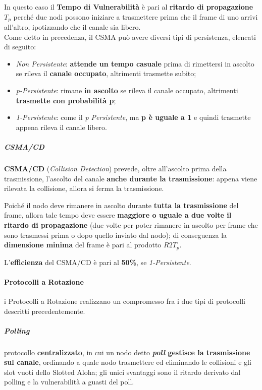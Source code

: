 \documentclass[a4paper]{article}
\begin{document}
						In questo caso il \textbf{Tempo di Vulnerabilità} è pari al \textbf{ritardo di propagazione} $ T_{p} $ perché due nodi possono iniziare a trasmettere prima che il frame di uno arrivi all'altro, ipotizzando che il canale sia libero. \\
						
						Come detto in precedenza, il CSMA può avere diversi tipi di persistenza, elencati di seguito:
						\begin{itemize}
							\item \emph{Non Persistente}: \textbf{attende un tempo casuale} prima di rimettersi in ascolto se rileva il \textbf{canale occupato}, altrimenti trasmette subito;
							\item \emph{p-Persistente}: rimane \textbf{in ascolto} se rileva il canale occupato, altrimenti \textbf{trasmette con probabilità p};
							\item \emph{1-Persistente}: come il \emph{p Persistente}, ma \textbf{p è uguale a 1} e quindi trasmette appena rileva il canale libero.
						\end{itemize}
						
					\subparagraph{CSMA/CD}
						\textbf{CSMA/CD} (\emph{Collision Detection}) prevede, oltre all'ascolto prima della trasmissione, l'ascolto del canale \textbf{anche durante la trasmissione}: appena viene rilevata la collisione, allora si ferma la trasmissione.
						
						Poiché il nodo deve rimanere in ascolto durante \textbf{tutta la trasmissione} del frame, allora tale tempo deve essere \textbf{maggiore o uguale a due volte il ritardo di propagazione} (due volte per poter rimanere in ascolto per frame che sono trasmessi prima o dopo quello inviato dal nodo); di conseguenza la \textbf{dimensione minima} del frame è pari al prodotto $ R2T_{p} $.
						
						L'\textbf{efficienza} del CSMA/CD è pari al \textbf{50\%}, se \emph{1-Persistente}.
						
				\paragraph{Protocolli a Rotazione}
					i Protocolli a Rotazione realizzano un compromesso fra i due tipi di protocolli descritti precedentemente.
					
					\subparagraph{Polling}
						protocollo \textbf{centralizzato}, in cui un nodo detto \textbf{\emph{poll} gestisce la trasmissione sul canale}, ordinando a quale nodo trasmettere ed eliminando le collisioni e gli slot vuoti dello Slotted Aloha; gli unici svantaggi sono il ritardo derivato dal polling e la vulnerabilità a guasti del poll.
						
\end{document}
